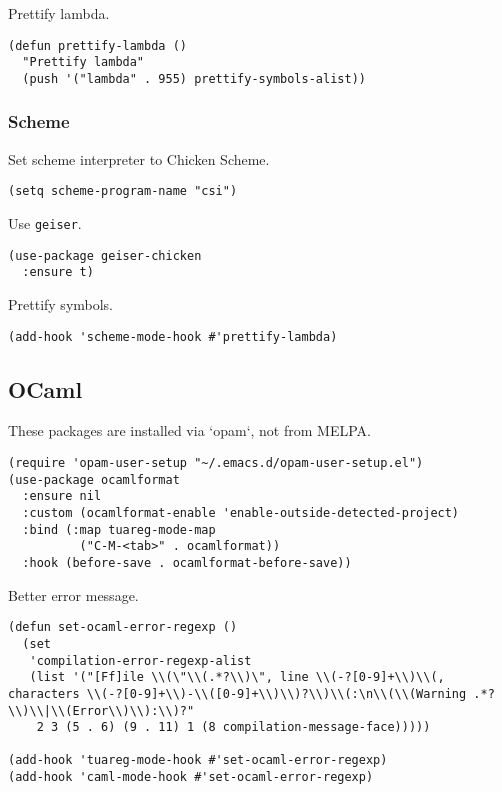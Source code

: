 \documentclass[a4paper,11pt]{article}
\begin{document}
Prettify lambda.
\begin{verbatim}
(defun prettify-lambda ()
  "Prettify lambda"
  (push '("lambda" . 955) prettify-symbols-alist))
\end{verbatim}

\subsubsection{Scheme}
\label{sec:orga222c75}
Set scheme interpreter to Chicken Scheme.
\begin{verbatim}
(setq scheme-program-name "csi")
\end{verbatim}

Use \texttt{geiser}.
\begin{verbatim}
(use-package geiser-chicken
  :ensure t)
\end{verbatim}

Prettify symbols.
\begin{verbatim}
(add-hook 'scheme-mode-hook #'prettify-lambda)
\end{verbatim}

\subsection{OCaml}
\label{sec:org2e239ad}
These packages are installed via `opam`, not from MELPA.
\begin{verbatim}
(require 'opam-user-setup "~/.emacs.d/opam-user-setup.el")
(use-package ocamlformat
  :ensure nil
  :custom (ocamlformat-enable 'enable-outside-detected-project)
  :bind (:map tuareg-mode-map
	      ("C-M-<tab>" . ocamlformat))
  :hook (before-save . ocamlformat-before-save))
\end{verbatim}

Better error message.
\begin{verbatim}
(defun set-ocaml-error-regexp ()
  (set
   'compilation-error-regexp-alist
   (list '("[Ff]ile \\(\"\\(.*?\\)\", line \\(-?[0-9]+\\)\\(, characters \\(-?[0-9]+\\)-\\([0-9]+\\)\\)?\\)\\(:\n\\(\\(Warning .*?\\)\\|\\(Error\\)\\):\\)?"
    2 3 (5 . 6) (9 . 11) 1 (8 compilation-message-face)))))

(add-hook 'tuareg-mode-hook #'set-ocaml-error-regexp)
(add-hook 'caml-mode-hook #'set-ocaml-error-regexp)
\end{verbatim}
\end{document}
